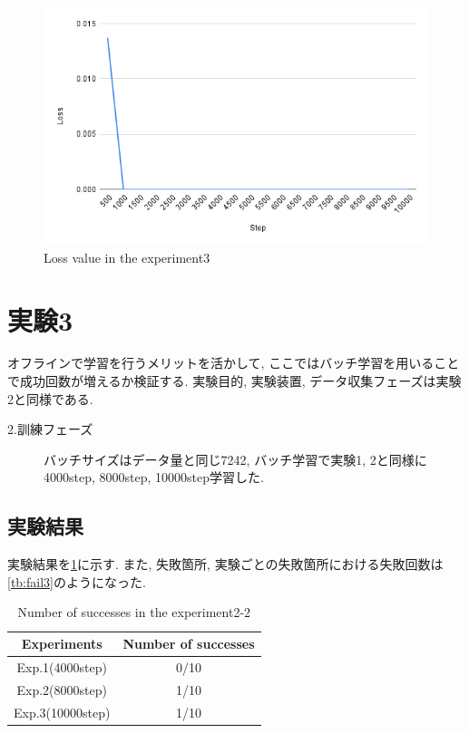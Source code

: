 \begin{figure}[h]
  \centering
  \includegraphics[keepaspectratio, scale=0.31]{images/exp2-10000.png}
  \caption{Loss value in the experiment3}
  \label{Fig:exp2-10000}
  \end{figure}
  
\newpage
\section{実験3}
オフラインで学習を行うメリットを活かして, ここではバッチ学習を用いることで成功回数が増えるか検証する. 実験目的, 実験装置, データ収集フェーズは実験2と同様である. 

\begin{description}
  \item[2.訓練フェーズ] バッチサイズはデータ量と同じ7242, バッチ学習で実験1, 2と同様に4000step, 8000step, 10000step学習した. 
\end{description}

\subsection{実験結果}
実験結果を\ref{tb:exp3}に示す. また, 失敗箇所, 実験ごとの失敗箇所における失敗回数は\ref{tb:fail3}のようになった.

\begin{table}[h]
  \centering
  \begin{tabular}{|c|c|} \hline
    Experiments & Number of successes \\ \hline
    Exp.1(4000step) & 0/10 \\ \hline
    Exp.2(8000step) & 1/10 \\ \hline
    Exp.3(10000step) & 1/10 \\ \hline
  \end{tabular}
  \caption{Number of successes in the experiment2-2}
  \label{tb:exp3}
\end{table}

